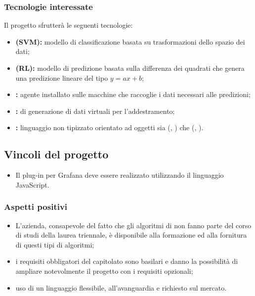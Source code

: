 		\subsubsection{Tecnologie interessate}
			Il progetto sfrutterà le seguenti tecnologie:
			\begin{itemize}
			  \item \textbf{ (SVM):} modello di classificazione basata su trasformazioni dello spazio dei dati;
			  \item \textbf{ (RL):} modello di predizione basata sulla differenza dei quadrati che genera una predizione lineare del tipo \(y=ax+b\);
				\item \textbf{:} agente installato sulle macchine che raccoglie i dati necessari alle predizioni;
				\item \textbf{:}  di generazione di dati virtuali per l'addestramento;
			  \item \textbf{:} linguaggio non tipizzato orientato ad oggetti sia  (, ) che  (, ).
			\end{itemize}

		\subsection{Vincoli del progetto}
			\begin{itemize}
				\item Il plug-in per Grafana deve essere realizzato utilizzando il linguaggio JavaScript.
			\end{itemize}

		\subsubsection{Aspetti positivi}
			\begin{itemize}
			  \item L’azienda, consapevole del fatto che gli algoritmi di  non fanno parte del corso di studi della laurea triennale, è disponibile alla formazione ed alla fornitura di questi tipi di algoritmi;
			  \item i requisiti obbligatori del capitolato sono basilari e danno la possibilità di ampliare notevolmente il progetto con i requisiti opzionali;
			  \item uso di un linguaggio flessibile, all'avanguardia e richiesto sul mercato.
			\end{itemize}


